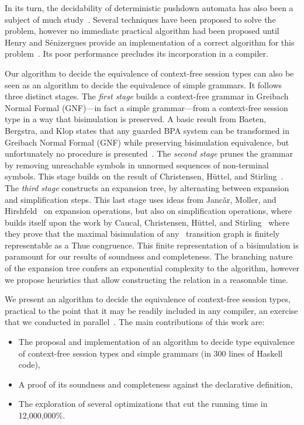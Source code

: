 In its turn, the decidability of deterministic pushdown automata 
has also been a subject of much 
study~\cite{janvcar2008selected,senizergues1997equivalence,stirling2001decidability}. 
Several techniques have been proposed to solve the problem, 
however no immediate practical algorithm had been proposed until
Henry and S{\'e}nizergues provide an implementation of a correct algorithm 
for this problem~\cite{henry2013lalblc}. Its poor performance
precludes its incorporation in a compiler.

Our algorithm to decide the equivalence of context-free session types
can also be seen as an algorithm to decide the equivalence of simple
grammars. It follows three distinct stages.
%
The \emph{first stage} builds a context-free grammar in Greibach
Normal Formal (GNF)---in fact a simple grammar---from a context-free
session type in a way that bisimulation is preserved.  A basic result
from Baeten, Bergstra, and Klop states that any guarded BPA system can
be transformed in Greibach Normal Formal (GNF) while preserving
bisimulation equivalence, but unfortunately no procedure is
presented~\cite{baeten1993decidability}.
%
The \emph{second stage} prunes the grammar by removing unreachable
symbols in unnormed sequences of non-terminal symbols. This stage
builds on the result of Christensen, H\"uttel, and Stirling~\cite{DBLP:journals/iandc/ChristensenHS95}.
%
The \emph{third stage} constructs an expansion tree, by alternating
between expansion and simplification steps. This last stage uses ideas
from Janc\v ar, Moller, and
Hirshfeld~\cite{hirshfeld1996bisimulation,janvcar1999techniques} on
expansion operations, but also on simplification operations,
where~\cite{janvcar1999techniques} builds itself upon the work by
Caucal, Christensen, H\"uttel, and
Stirling~\cite{caucal1986decidabilite,
  DBLP:journals/iandc/ChristensenHS95} where they prove that the
maximal bisimulation of any \BPA\ transition graph is finitely
representable as a Thue congruence. This finite representation of a
bisimulation is paramount for our results of soundness and
completeness. The branching nature of the expansion tree confers an
exponential complexity to the algorithm, however we propose heuristics
that allow constructing the relation in a reasonable time.

We present an algorithm to decide the equivalence of context-free
session types, practical to the point that it may be readily included
in any compiler, an exercise that we conducted in
parallel~\cite{freeST}.
%
The main contributions of this work are:
%
\begin{itemize}
\item The proposal and implementation of an algorithm to decide type
  equivalence of context-free session types and simple grammars (in
  300 lines of Haskell code),
\item A proof of its soundness and completeness against the
  declarative definition,
\item The exploration of several optimizations that cut the running
  time in 12,000,000\%.
\end{itemize}

